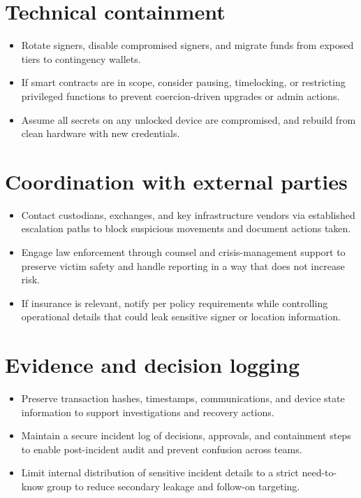 \section{Technical containment}\label{technical-containment}

\begin{itemize}
\tightlist
\item
  Rotate signers, disable compromised signers, and migrate funds from exposed tiers to contingency wallets.
\item
  If smart contracts are in scope, consider pausing, timelocking, or restricting privileged functions to prevent coercion-driven upgrades or admin actions.
\item
  Assume all secrets on any unlocked device are compromised, and rebuild from clean hardware with new credentials.
\end{itemize}

\section{Coordination with external parties}\label{coordination-with-external-parties}

\begin{itemize}
\tightlist
\item
  Contact custodians, exchanges, and key infrastructure vendors via established escalation paths to block suspicious movements and document actions taken.
\item
  Engage law enforcement through counsel and crisis-management support to preserve victim safety and handle reporting in a way that does not increase risk.
\item
  If insurance is relevant, notify per policy requirements while controlling operational details that could leak sensitive signer or location information.
\end{itemize}

\section{Evidence and decision logging}\label{evidence-and-decision-logging}

\begin{itemize}
\tightlist
\item
  Preserve transaction hashes, timestamps, communications, and device state information to support investigations and recovery actions.
\item
  Maintain a secure incident log of decisions, approvals, and containment steps to enable post-incident audit and prevent confusion across teams.
\item
  Limit internal distribution of sensitive incident details to a strict need-to-know group to reduce secondary leakage and follow-on targeting.
\end{itemize}

